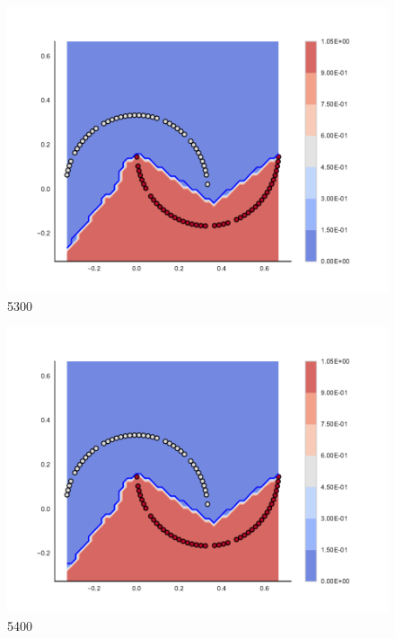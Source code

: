 \begin{subfigure}[b]{0.09\textwidth}
    \includegraphics[clip, trim=2.35cm 1.75cm 4.5cm 0cm,width=\textwidth]{img/convergence/5300.pdf}
    \caption{5300}
    \label{fig:convergence_5300}
\end{subfigure}
%
\begin{subfigure}[b]{0.09\textwidth}
    \includegraphics[clip, trim=2.35cm 1.75cm 4.5cm 0cm,width=\textwidth]{img/convergence/5400.pdf}
    \caption{5400}
    \label{fig:convergence_5400}
\end{subfigure}
%
